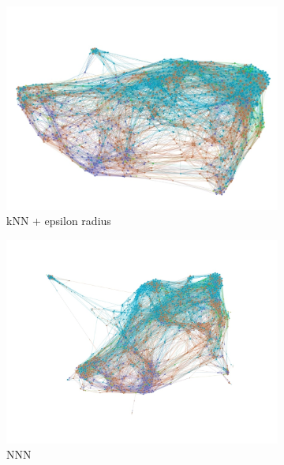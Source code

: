 \documentclass[slovak,master,dept460,male,cpp,cpdeclaration]{diploma}
\begin{document}
\begin{figure}[H]
\centering
\begin{subfigure}{0.45\textwidth}
    \centering
    \includegraphics[width=\linewidth, frame]{Graphs/network_wine_red_knn_epsilon.jpg}
    \caption{kNN + epsilon radius}
    \label{fig:wine_knn_eps}
\end{subfigure}\hfil
\begin{subfigure}{0.45\textwidth}
    \centering
    \includegraphics[width=\linewidth, frame]{Graphs/network_wine_red_nnn.jpg}
    \caption{NNN}
    \label{fig:wine_nnn}
\end{subfigure}
\medskip
\begin{subfigure}{0.45\textwidth}
    \centering

\end{subfigure}
\end{figure}
\end{document}
